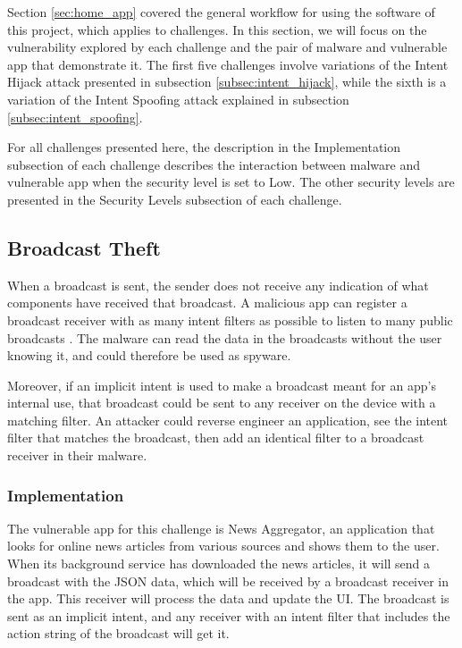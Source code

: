     Section \ref{sec:home_app} covered the general workflow for using the software of this project, which applies to challenges. In this section, we will focus on the vulnerability explored by each challenge and the pair of malware and vulnerable app that demonstrate it. The first five challenges involve variations of the Intent Hijack attack presented in subsection \ref{subsec:intent_hijack}, while the sixth is a variation of the Intent Spoofing attack explained in subsection \ref{subsec:intent_spoofing}.
    
    For all challenges presented here, the description in the Implementation subsection of each challenge describes the interaction between malware and vulnerable app when the security level is set to Low. The other security levels are presented in the Security Levels subsection of each challenge.
    
    \subsection{Broadcast Theft}
        \label{subsec:broadcast_theft}
        
    When a broadcast is sent, the sender does not receive any indication of what components have received that broadcast. A malicious app can register a broadcast receiver with as many intent filters as possible to listen to many public broadcasts \cite{2010_icc_paper}. The malware can read the data in the broadcasts without the user knowing it, and could therefore be used as spyware. 
    
    Moreover, if an implicit intent is used to make a broadcast meant for an app’s internal use, that broadcast could be sent to any receiver on the device with a matching filter. An attacker could reverse engineer an application, see the intent filter that matches the broadcast, then add an identical filter to a broadcast receiver in their malware.
    
    \subsubsection{Implementation}
        \label{subsubsec:broadcast_theft_implementation}
        
    The vulnerable app for this challenge is News Aggregator, an application that looks for online news articles from various sources and shows them to the user. When its background service has downloaded the news articles, it will send a broadcast with the JSON data, which will be received by a broadcast receiver in the app. This receiver will process the data and update the UI. The broadcast is sent as an implicit intent, and any receiver with an intent filter that includes the action string of the broadcast will get it.
    
